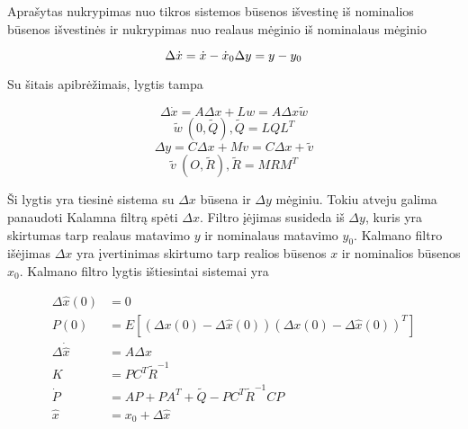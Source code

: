 \documentclass[12pt, a4paper, lithuanian]{article}
\begin{document}
        Aprašytas nukrypimas nuo tikros sistemos būsenos išvestinę iš nominalios būsenos išvestinės ir nukrypimas nuo realaus mėginio iš nominalaus mėginio

        \begin{equation}
            \Delta \dot{x} = \dot{x} - \dot{x}_0 \\
            \Delta y = y - y_0
        \end{equation}

        Su šitais apibrėžimais, lygtis tampa

        \begin{equation}
            \Delta \dot{x} = A \Delta x + Lw = A \Delta x \tilde{w}
        \end{equation}
        \begin{equation}
            \tilde{w} ~ (0, \tilde{Q}), \tilde{Q} = LQL^T
        \end{equation}
        \begin{equation}
            \Delta y = C \Delta x + Mv = C \Delta x + \tilde{v}
        \end{equation}
        \begin{equation}
            \tilde{v} ~ (O, \tilde{R}), \tilde{R} = MRM^T
        \end{equation}

        Ši lygtis yra tiesinė sistema su $\Delta x$ būsena ir $\Delta y$ mėginiu.
        Tokiu atveju galima panaudoti Kalamna filtrą spėti $\Delta x$.
        Filtro įėjimas susideda iš $\Delta y$, kuris yra skirtumas tarp realaus matavimo $y$ ir nominalaus matavimo $y_0$.
        Kalmano filtro išėjimas $\Delta x$ yra įvertinimas skirtumo tarp realios būsenos $x$ ir nominalios būsenos $x_0$.
        Kalmano filtro lygtis ištiesintai sistemai yra

        \begin{equation}
            \label{eq:linerialized_kalman_filter}
            \begin{aligned}
                \Delta \hat{x} (0) &= 0\\
                P(0) &= E[(\Delta x(0) - \Delta \hat{x}(0))(\Delta{x}(0) - \Delta \hat{x}(0))^T]\\
                \Delta \dot{\hat{x}} &= A \Delta \hat{x} \\
                K &= PC^T\tilde{R}^{-1}\\
                \dot{P} &= AP + PA^T + \tilde{Q} - PC^T\tilde{R}^{-1}CP\\
                \hat{x} &= x_0 + \Delta \hat{x}
            \end{aligned}
        \end{equation}
\end{document}
